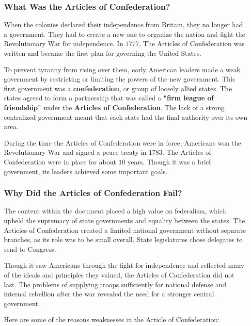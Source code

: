 
\subsubsection*{What Was the Articles of Confederation?}

When the colonies declared their independence from Britain, they no longer had
a government. They had to create a new one to organize the nation and fight the
Revolutionary War for independence. In $1777$, The Articles of Confederation
was written and became the first plan for governing the United States.

To prevent tyranny from rising over them, early American leaders made a weak
government by restricting or limiting the powers of the new government. This
first government was a \textbf{confederation}, or group of loosely allied
states. The states agreed to form a partnership that was called a \textbf{"firm
league of friendship"} under the \textbf{Articles of Confederation}. The lack
of a strong centralized government meant that each state had the final
authority over its own area.

During the time the Articles of Confederation were in force, Americans won the
Revolutionary War and signed a peace treaty in $1783$. The Articles of
Confederation were in place for about $10$ years. Though it was a brief
government, its leaders achieved some important goals. 

\subsubsection*{Why Did the Articles of Confederation Fail?}

The content within the document placed a high value on federalism, which upheld
the supremacy of state governments and equality between the states. The
Articles of Confederation created a limited national government without
separate branches, as its role was to be small overall. State legislatures
chose delegates to send to Congress.

Though it saw Americans through the fight for independence and reflected many
of the ideals and principles they valued, the Articles of Confederation did not
last. The problems of supplying troops sufficiently for national defense and
internal rebellion after the war revealed the need for a stronger central
government.

Here are some of the reasons weaknesses in the Article of Confederation:


